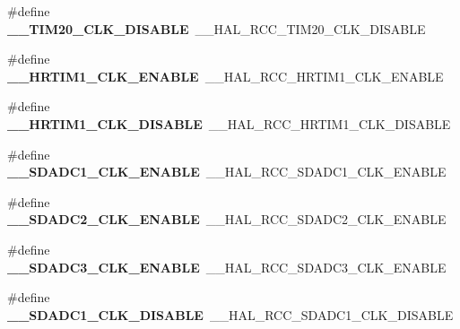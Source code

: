 \begin{DoxyCompactItemize}
\item 
\#define {\bfseries \+\_\+\+\_\+\+T\+I\+M20\+\_\+\+C\+L\+K\+\_\+\+D\+I\+S\+A\+B\+LE}~\+\_\+\+\_\+\+H\+A\+L\+\_\+\+R\+C\+C\+\_\+\+T\+I\+M20\+\_\+\+C\+L\+K\+\_\+\+D\+I\+S\+A\+B\+LE\hypertarget{group___h_a_l___r_c_c___aliased_gac795b2f6f86b1444869608b8cdd2ded5}{}\label{group___h_a_l___r_c_c___aliased_gac795b2f6f86b1444869608b8cdd2ded5}

\item 
\#define {\bfseries \+\_\+\+\_\+\+H\+R\+T\+I\+M1\+\_\+\+C\+L\+K\+\_\+\+E\+N\+A\+B\+LE}~\+\_\+\+\_\+\+H\+A\+L\+\_\+\+R\+C\+C\+\_\+\+H\+R\+T\+I\+M1\+\_\+\+C\+L\+K\+\_\+\+E\+N\+A\+B\+LE\hypertarget{group___h_a_l___r_c_c___aliased_gaa8ef9aa8aac2736d3795d30295bef523}{}\label{group___h_a_l___r_c_c___aliased_gaa8ef9aa8aac2736d3795d30295bef523}

\item 
\#define {\bfseries \+\_\+\+\_\+\+H\+R\+T\+I\+M1\+\_\+\+C\+L\+K\+\_\+\+D\+I\+S\+A\+B\+LE}~\+\_\+\+\_\+\+H\+A\+L\+\_\+\+R\+C\+C\+\_\+\+H\+R\+T\+I\+M1\+\_\+\+C\+L\+K\+\_\+\+D\+I\+S\+A\+B\+LE\hypertarget{group___h_a_l___r_c_c___aliased_gaa4f872cf7c18f0c24f989024d5c6578f}{}\label{group___h_a_l___r_c_c___aliased_gaa4f872cf7c18f0c24f989024d5c6578f}

\item 
\#define {\bfseries \+\_\+\+\_\+\+S\+D\+A\+D\+C1\+\_\+\+C\+L\+K\+\_\+\+E\+N\+A\+B\+LE}~\+\_\+\+\_\+\+H\+A\+L\+\_\+\+R\+C\+C\+\_\+\+S\+D\+A\+D\+C1\+\_\+\+C\+L\+K\+\_\+\+E\+N\+A\+B\+LE\hypertarget{group___h_a_l___r_c_c___aliased_ga276bdce4ddd1f6b148ce55ccf3160500}{}\label{group___h_a_l___r_c_c___aliased_ga276bdce4ddd1f6b148ce55ccf3160500}

\item 
\#define {\bfseries \+\_\+\+\_\+\+S\+D\+A\+D\+C2\+\_\+\+C\+L\+K\+\_\+\+E\+N\+A\+B\+LE}~\+\_\+\+\_\+\+H\+A\+L\+\_\+\+R\+C\+C\+\_\+\+S\+D\+A\+D\+C2\+\_\+\+C\+L\+K\+\_\+\+E\+N\+A\+B\+LE\hypertarget{group___h_a_l___r_c_c___aliased_ga16ecec4c60d069b7d6c99aefc8956d79}{}\label{group___h_a_l___r_c_c___aliased_ga16ecec4c60d069b7d6c99aefc8956d79}

\item 
\#define {\bfseries \+\_\+\+\_\+\+S\+D\+A\+D\+C3\+\_\+\+C\+L\+K\+\_\+\+E\+N\+A\+B\+LE}~\+\_\+\+\_\+\+H\+A\+L\+\_\+\+R\+C\+C\+\_\+\+S\+D\+A\+D\+C3\+\_\+\+C\+L\+K\+\_\+\+E\+N\+A\+B\+LE\hypertarget{group___h_a_l___r_c_c___aliased_ga50aefed27799abc72d6b30099a764208}{}\label{group___h_a_l___r_c_c___aliased_ga50aefed27799abc72d6b30099a764208}

\item 
\#define {\bfseries \+\_\+\+\_\+\+S\+D\+A\+D\+C1\+\_\+\+C\+L\+K\+\_\+\+D\+I\+S\+A\+B\+LE}~\+\_\+\+\_\+\+H\+A\+L\+\_\+\+R\+C\+C\+\_\+\+S\+D\+A\+D\+C1\+\_\+\+C\+L\+K\+\_\+\+D\+I\+S\+A\+B\+LE\hypertarget{group___h_a_l___r_c_c___aliased_ga7bee6f236c8a299f3b751b46612348a5}{}\label{group___h_a_l___r_c_c___aliased_ga7bee6f236c8a299f3b751b46612348a5}


\end{DoxyCompactItemize}
